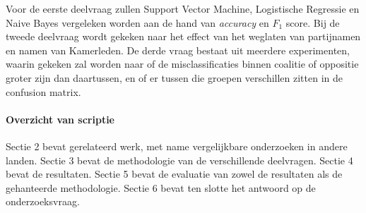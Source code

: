 Voor de eerste deelvraag zullen Support Vector Machine, Logistische Regressie en Naive Bayes vergeleken worden aan de hand van \textit{accuracy} en $F_1$ score. Bij de tweede deelvraag wordt gekeken naar het effect van het weglaten van partijnamen en namen van Kamerleden. De derde vraag bestaat uit meerdere experimenten, waarin gekeken zal worden naar of de misclassificaties binnen coalitie of oppositie groter zijn dan daartussen, en of er tussen die groepen verschillen zitten in de confusion matrix. 


\paragraph{Overzicht van scriptie}
Sectie 2 bevat gerelateerd werk, met name vergelijkbare onderzoeken in andere landen. Sectie 3 bevat de methodologie van de verschillende deelvragen. Sectie 4 bevat de resultaten. Sectie 5 bevat de evaluatie van zowel de resultaten als de gehanteerde methodologie. Sectie 6 bevat ten slotte het antwoord op de onderzoeksvraag.
